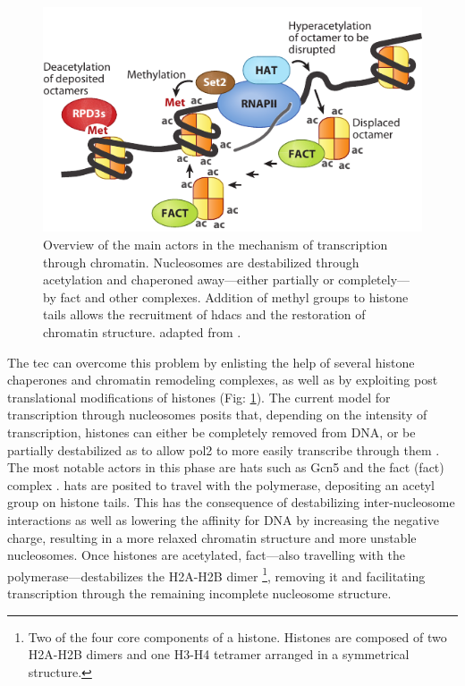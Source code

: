 \begin{figure}[ht]

\centering
\includegraphics[width=\textwidth]{figures/introduction/nucTranscription}
\caption[Mechanism of transcription through chromatin.]{Overview of the main actors in the mechanism of transcription through chromatin.
Nucleosomes are destabilized through acetylation and chaperoned away---either partially or completely---by \gls{fact} and other complexes.
Addition of methyl groups to histone tails allows the recruitment of \gls{hdacs} and the restoration of chromatin structure.
adapted from \citep{selth:2010:transcript}. }
\label{fig:nucTranscription}

\end{figure}

The \gls{tec} can overcome this problem by enlisting the help of several histone chaperones and chromatin remodeling complexes, as well as by exploiting post translational modifications of histones (Fig: \ref{fig:nucTranscription}). 
The current model for transcription through nucleosomes posits that, depending on the intensity of transcription, histones can either be completely removed from DNA, or be partially destabilized as to allow \gls{pol2} to more easily transcribe through them \citep{kulaeva:2013:mechanism}.
The most notable actors in this phase are \gls{hats} such as Gcn5 and the \gls{fact} (\glsdesc{fact}) complex \citep[for review see:][]{reinberg:2006:de}. 
\gls{hats} are posited to travel with the polymerase, depositing an acetyl group on histone tails.
This has the consequence of destabilizing inter-nucleosome interactions as well as lowering the affinity for DNA by increasing the negative charge, resulting in a more relaxed chromatin structure and more unstable nucleosomes.
Once histones are acetylated, \gls{fact}---also travelling with the polymerase---destabilizes the H2A-H2B dimer \footnote{
Two of the four core components of a histone. Histones are composed of two H2A-H2B dimers and one H3-H4 tetramer arranged in a symmetrical structure. 
}, removing it and facilitating transcription through the remaining incomplete nucleosome structure. 

